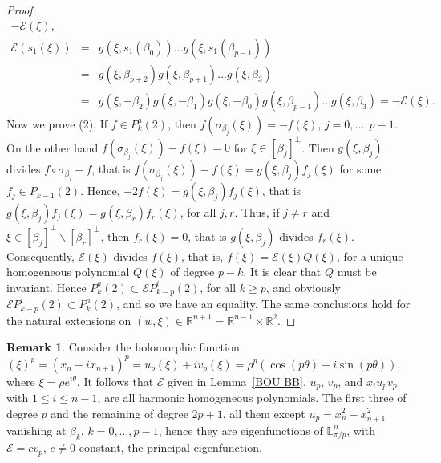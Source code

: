 \documentclass[11pt,a4paper,times]{amsart}
\theoremstyle{plain}
\theoremstyle{definition}
\newtheorem{remark}{Remark}[section]
\numberwithin{equation}{section}
\newcommand{\lune}[2]{\mathbb{L}^{#1}_{#2}}
\begin{document}
{\begin{proof}
\begin{eqnarray*}
-\mathcal{E}(\xi),\\[1mm]
\mathcal{E}(s_1(\xi))
&=&g(\xi,s_1(\beta_0))\ldots g(\xi,s_1(\beta_{p-1}))\\
&=&g(\xi,\beta_{p+2})g(\xi,\beta_{p+1})\ldots 
g(\xi,\beta_3)\\
&=&g(\xi, -\beta_2)g(\xi,-\beta_1)g(\xi,-\beta_0)g(\xi,\beta_{p-1})\ldots g(\xi,\beta_3)=
-\mathcal{E}(\xi).
\end{eqnarray*}
Now we prove (2). 
 If $f\in P^a_k(2)$, then $f(\sigma_{\beta_j}(\xi))=-f(\xi)$, $j=0, \ldots, p-1$. On the other hand
 $f(\sigma_{\beta_j}(\xi))-f(\xi)=0$ for $\xi\in [\beta_j]^{\bot}$. Then $g(\xi,\beta_j)$ divides $f\circ \sigma_{\beta_j} -f$, that is
 $f(\sigma_{\beta_j}(\xi))-f(\xi)=g(\xi,\beta_j)f_j(\xi)$ 
 for some $f_j\in P_{k-1}(2)$. Hence,
 $-2f(\xi)=g(\xi,\beta_j)f_j(\xi)$, that is $g(\xi,\beta_j)f_j(\xi)=g(\xi,\beta_r)f_r(\xi)$,  for all $j, r$.
   Thus, if  $j\neq r$ and $\xi\in [\beta_j]^{\bot}\backslash [\beta_r]^{\bot}$, then
 $f_r(\xi)=0$, that is  $g(\xi,\beta_j)$ divides $f_r(\xi)$.
 Consequently, 
 $\mathcal{E}(\xi)$ divides $f(\xi)$, that is, 
  $f(\xi)=\mathcal{E}(\xi)Q(\xi)$, {for a unique homogeneous polynomial $Q(\xi)$ of degree $p-k$. It is clear that $Q$ must be invariant. }
Hence $P^a_k(2)\subset \mathcal{E}P^i_{k-p}(2)$, for all $k\geq p$, and obviously $\mathcal{E}P^i_{k-p}(2)\subset P^a_k(2)$, and so we have an equality. 
The same conclusions hold for the natural  extensions on $(w,\xi)\in \mathbb{R}^{n+1}=\mathbb{R}^{n-1}\times \mathbb{R}^2$. 
\end{proof}
\begin{remark} {Consider the holomorphic function $(\xi)^p=(x_n+ix_{n+1})^{p}=u_p(\xi)+iv_p(\xi)=\rho^p(\cos(p\theta)+i\sin(p\theta))$,
where $\xi=\rho e^{i\theta}$. It follows that  $\mathcal{E}$ given in Lemma~\ref{BOU BB}, $u_p$, $v_p$, and $x_iu_pv_p$ with $1\leq i\leq n-1$,
are all harmonic homogeneous polynomials. The first three of degree $p$ and the remaining of degree $2p+1$, all them except $u_p=x_n^2-x_{n+1}^2$
vanishing at $\beta_k$, $k=0, \ldots, p-1$, hence they are
eigenfunctions of $\lune{n}{\pi/p}$, with $\mathcal{E}=c v_p$, $c\neq 0$ constant, the principal eigenfunction.}
\end{remark} 

}
\end{document}
